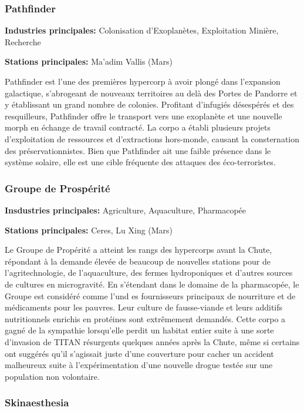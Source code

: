 \subsubsection{Pathfinder} \label{sec:pathfinder} 

\textbf{Industries principales:} Colonisation d'Exoplanètes, Exploitation Minière, Recherche 

\textbf{Stations principales:} Ma'adim Vallis (Mars) 

Pathfinder est l'une des premières hypercorp à avoir plongé dans l'expansion galactique, s'abrogeant de nouveaux territoires au delà des Portes de Pandorre et y établissant un grand nombre de colonies. Profitant d'infugiés désespérés et des resquilleurs, Pathfinder offre le transport vers une exoplanète et une nouvelle morph en échange de travail contracté. La corpo a établi plusieurs projets d'exploitation de ressources et d'extractions hors-monde, causant la consternation des préservationnistes. Bien que Pathfinder ait une faible présence dans le système solaire, elle est une cible fréquente des attaques des éco-terroristes. 

\subsubsection{Groupe de Prospérité} \label{sec:prosperity-group} 

\textbf{Insdustries principales:} Agriculture, Aquaculture, Pharmacopée 

\textbf{Stations principales:} Ceres, Lu Xing (Mars) 

Le Groupe de Propérité a atteint les rangs des hypercorps avant la Chute, répondant à la demande élevée de beaucoup de nouvelles stations pour de l'agritechnologie, de l'aquaculture, des fermes hydroponiques et d'autres sources de cultures en microgravité. En s'étendant dans le domaine de la pharmacopée, le Groupe est considéré comme l'und es fournisseurs principaux de nourriture et de médicaments pour les pauvres. Leur culture de fausse-viande et leurs additifs nutritionnels enrichis en protéines sont extrêmement demandés. Cette corpo a gagné de la sympathie lorsqu'elle perdit un habitat entier suite à une sorte d'invasion de TITAN résurgents quelques années après la Chute, même si certains ont suggérés qu'il s'agissait juste d'une couverture pour cacher un accident malheureux suite à l'expérimentation d'une nouvelle drogue testée sur une population non volontaire. 

\subsubsection{Skinaesthesia} \label{sec:skinaethesia} 

